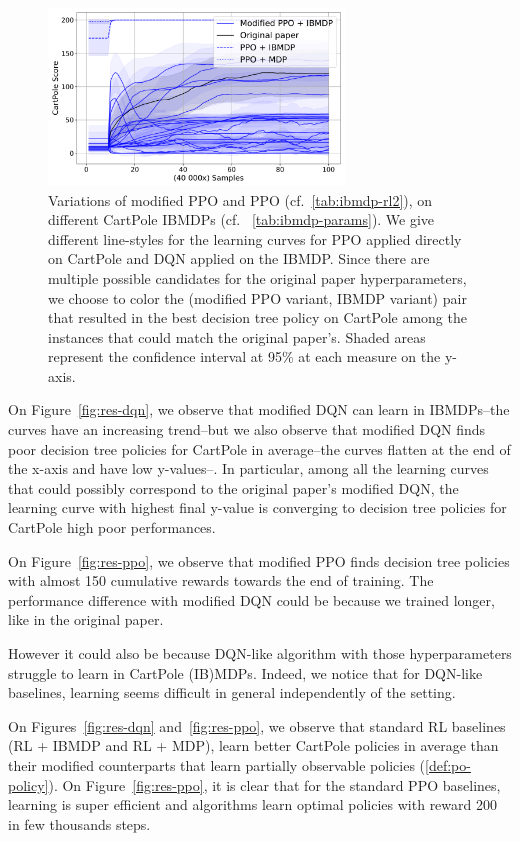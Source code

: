 \begin{figure}
    \centering
    \includegraphics[width=0.7\textwidth]{images/images_part1/ppo.pdf}
    \caption{Variations of modified PPO and PPO (cf.~\ref{tab:ibmdp-rl2}), on different CartPole IBMDPs (cf. ~\ref{tab:ibmdp-params}). We give different line-styles for the learning curves for PPO applied directly on CartPole and DQN applied on the IBMDP.
    Since there are multiple possible candidates for the original paper hyperparameters, we choose to color the (modified PPO variant, IBMDP variant) pair that resulted in the best decision tree policy on CartPole among the instances that could match the original paper's.
    Shaded areas represent the confidence interval at 95\% at each measure on the y-axis.}
\end{figure}\label{fig:res-ppo}

On Figure~\ref{fig:res-dqn}, we observe that modified DQN can learn in IBMDPs--the curves have an increasing trend--but we also observe that modified DQN finds poor decision tree policies for CartPole in average--the curves flatten at the end of the x-axis and have low y-values--.
In particular, among all the learning curves that could possibly correspond to the original paper's modified DQN, the learning curve with highest final y-value is converging to decision tree policies for CartPole high poor performances.

On Figure~\ref{fig:res-ppo}, we observe that modified PPO finds decision tree policies with almost 150 cumulative rewards towards the end of training. The performance difference with modified DQN could be because we trained longer, like in the original paper.

However it could also be because DQN-like algorithm with those hyperparameters struggle to learn in CartPole (IB)MDPs.
Indeed, we notice that for DQN-like baselines, learning seems difficult in general independently of the setting.

On Figures~\ref{fig:res-dqn} and~\ref{fig:res-ppo}, we observe that standard RL baselines (RL + IBMDP and RL + MDP), learn better CartPole policies in average than their modified counterparts that learn partially observable policies (\ref{def:po-policy}). 
On Figure~\ref{fig:res-ppo}, it is clear that for the standard PPO baselines, learning is super efficient and algorithms learn optimal policies with reward 200 in few thousands steps.

